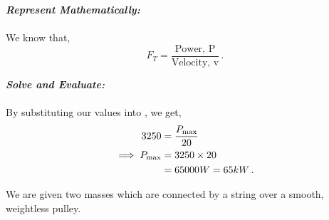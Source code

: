 \begin{subquestions}
\begin{subsubquestions}
\textbf{\textit{Represent Mathematically:}} \\ \\
We know that,
\begin{equation}
	F_T  = \frac{\text{Power, P}}{\text{Velocity, v}} \,. \label{2011:q5:PEqn1} 
\end{equation}




\textbf{\textit{Solve and Evaluate:}} \\ \\
By substituting our values into , we get,
\begin{align}
	3250 & = \frac{P_{\text{max}}}{20} \nonumber \\
	\implies P_{\text{max}} & = 3250 \times 20 \nonumber \\
	               & = 65000W = 65kW \,.
\end{align}
	
\end{subsubquestions}	
	
	
\subquestion
We are given two masses which are connected by a string over a smooth, weightless pulley.

\begin{subsubquestions}
	
	\subsubquestion
	

\end{subsubquestions}
\end{subquestions}
